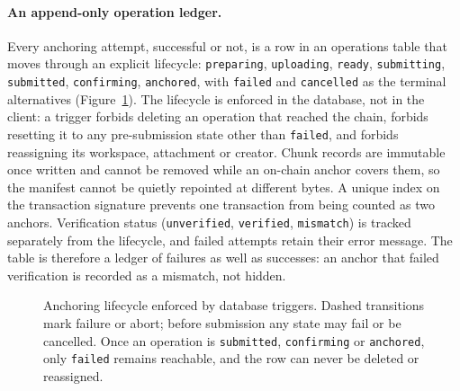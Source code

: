 \documentclass[10pt,a4paper,twocolumn]{article}
\begin{document}
\paragraph{An append-only operation ledger.}
Every anchoring attempt, successful or not, is a row in an operations table that
moves through an explicit lifecycle: \texttt{preparing}, \texttt{uploading},
\texttt{ready}, \texttt{submitting}, \texttt{submitted}, \texttt{confirming},
\texttt{anchored}, with \texttt{failed} and \texttt{cancelled} as the terminal
alternatives (Figure~\ref{fig:lifecycle}). The lifecycle is enforced in the database, not in the client: a
trigger forbids deleting an operation that reached the chain, forbids resetting it
to any pre-submission state other than \texttt{failed}, and forbids reassigning its
workspace, attachment or creator. Chunk records are immutable once written and
cannot be removed while an on-chain anchor covers them, so the manifest cannot be
quietly repointed at different bytes. A unique index on the transaction signature
prevents one transaction from being counted as two anchors. Verification status
(\texttt{unverified}, \texttt{verified}, \texttt{mismatch}) is tracked separately
from the lifecycle, and failed attempts retain their error message. The table is
therefore a ledger of failures as well as successes: an anchor that failed
verification is recorded as a mismatch, not hidden.

\begin{figure}[t]
\centering
{}
\caption{Anchoring lifecycle enforced by database triggers. Dashed transitions mark
failure or abort; before submission any state may fail or be cancelled. Once an
operation is \texttt{submitted}, \texttt{confirming} or \texttt{anchored}, only
\texttt{failed} remains reachable, and the row can never be deleted or reassigned.}
\label{fig:lifecycle}
\end{figure}
\end{document}
